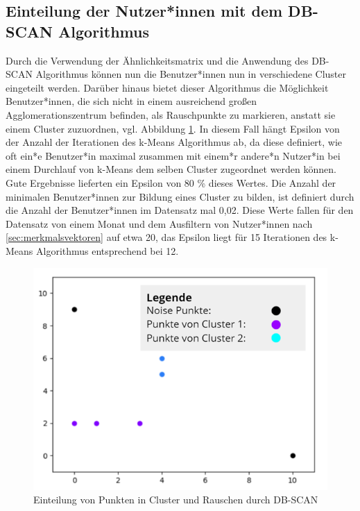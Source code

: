\subsection{Einteilung der Nutzer*innen mit dem DB-SCAN Algorithmus}
Durch die Verwendung der Ähnlichkeitsmatrix und die Anwendung des DB-SCAN Algorithmus können nun die Benutzer*innen nun in verschiedene Cluster eingeteilt werden. Darüber hinaus bietet dieser Algorithmus die Möglichkeit Benutzer*innen, die sich nicht in einem ausreichend großen Agglomerationszentrum befinden, als Rauschpunkte zu markieren, anstatt sie einem Cluster zuzuordnen, vgl. Abbildung \ref{fig:dbscan}. In diesem Fall hängt Epsilon von der Anzahl der Iterationen des k-Means Algorithmus ab, da diese definiert, wie oft ein*e Benutzer*in maximal zusammen mit einem*r andere*n Nutzer*in bei einem Durchlauf von k-Means dem selben Cluster zugeordnet werden können. Gute Ergebnisse lieferten ein Epsilon von 80 \% dieses Wertes. Die Anzahl der minimalen Benutzer*innen zur Bildung eines Cluster zu bilden, ist definiert durch die Anzahl der Benutzer*innen im Datensatz mal 0,02. Diese Werte fallen für den Datensatz von einem Monat und dem Ausfiltern von Nutzer*innen nach \ref{sec:merkmalsvektoren} auf etwa 20, das Epsilon liegt für 15 Iterationen des k-Means Algorithmus entsprechend bei 12. 
\begin{figure}[h]
	\centering
	\includegraphics[width=0.5\linewidth]{images/db_scan_example}
	\caption{Einteilung von Punkten in Cluster und Rauschen durch DB-SCAN}
	\label{fig:dbscan}
\end{figure}

